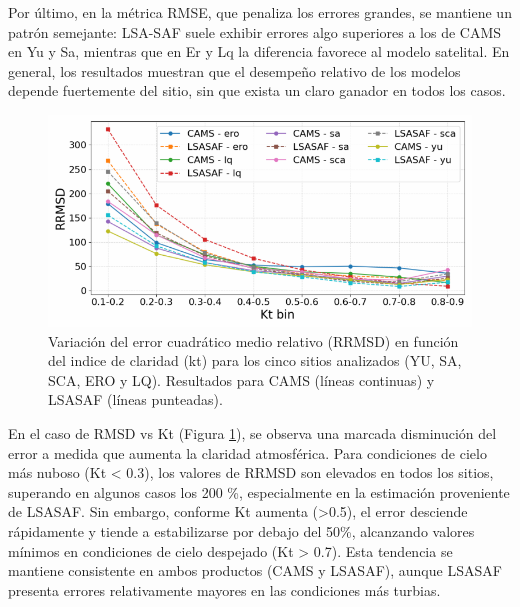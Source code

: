 Por último, en la métrica RMSE, que penaliza los errores grandes, se mantiene un patrón semejante: LSA-SAF suele exhibir errores algo superiores a los de CAMS en Yu y Sa, mientras que en Er y Lq la diferencia favorece al modelo satelital. En general, los resultados muestran que el desempeño relativo de los modelos depende fuertemente del sitio, sin que exista un claro ganador en todos los casos.\\



\begin{figure}
    \centering
    \includegraphics[width=\linewidth]{figuras/RMSE-kt-15.pdf}
    \caption{Variación del error cuadrático medio relativo (RRMSD) en función del indice de claridad (kt) para los cinco sitios analizados (YU, SA, SCA, ERO y LQ). Resultados para CAMS (líneas continuas) y LSASAF (líneas punteadas).}
    \label{fig:RMSE-kt-15}
\end{figure}



En el caso de RMSD vs Kt (Figura \ref{fig:RMSE-kt-15}), se observa una marcada disminución del error a medida que aumenta la claridad atmosférica. Para condiciones de cielo más nuboso (Kt < 0.3), los valores de RRMSD son elevados en todos los sitios, superando en algunos casos los 200 \%, especialmente en la estimación proveniente de LSASAF. Sin embargo, conforme Kt aumenta (>0.5), el error desciende rápidamente y tiende a estabilizarse por debajo del 50\%, alcanzando valores mínimos en condiciones de cielo despejado (Kt > 0.7). Esta tendencia se mantiene consistente en ambos productos (CAMS y LSASAF), aunque LSASAF presenta errores relativamente mayores en las condiciones más turbias.




